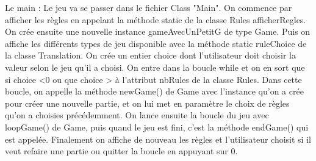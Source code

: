 Le main : Le jeu va se passer dans le fichier Class "Main".
On commence par afficher les règles en appelant la méthode static de la classe Rules
afficherRegles.
On crée ensuite une nouvelle instance gameAvecUnPetitG  de type Game.
Puis on affiche les différents types de jeu disponible avec la méthode static ruleChoice
de la classe Translation.
On crée un entier choice dont l'utilisateur doit choisir la valeur selon le jeu qu'il a choisi.
On entre dans la boucle while et on en sort que si choice <0 ou que choice > à l'attribut nbRules
de la classe Rules.
Dans cette boucle, on appelle la méthode newGame() de Game avec l'instance qu'on a crée pour créer une nouvelle partie, et on lui met en paramètre le choix de règles qu'on a choisies précédemment.
On lance ensuite la boucle du jeu avec loopGame() de Game, puis quand le jeu est fini, c'est la méthode endGame() qui est appelée.
Finalement on affiche de nouveau les règles et l'utilisateur choisit si il veut refaire une partie ou quitter la boucle en appuyant sur 0.